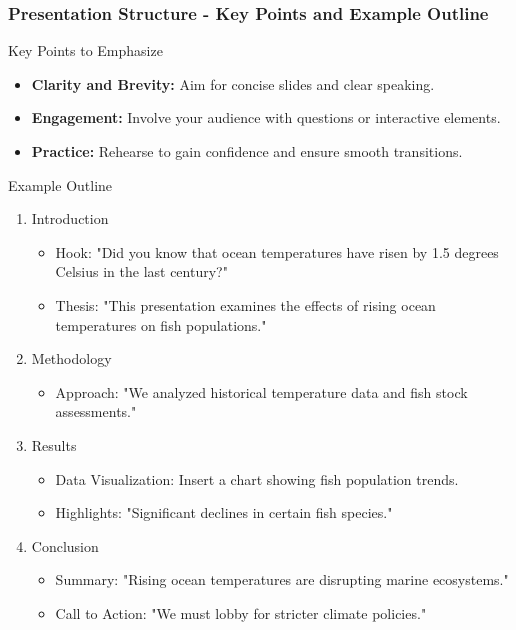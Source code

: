\documentclass[aspectratio=169]{beamer}
\begin{document}
\begin{frame}[fragile]
    \frametitle{Presentation Structure - Key Points and Example Outline}
    \begin{block}{Key Points to Emphasize}
        \begin{itemize}
            \item \textbf{Clarity and Brevity:} Aim for concise slides and clear speaking.
            \item \textbf{Engagement:} Involve your audience with questions or interactive elements.
            \item \textbf{Practice:} Rehearse to gain confidence and ensure smooth transitions.
        \end{itemize}
    \end{block}

    \begin{block}{Example Outline}
        \begin{enumerate}
            \item Introduction
                \begin{itemize}
                    \item Hook: "Did you know that ocean temperatures have risen by 1.5 degrees Celsius in the last century?"
                    \item Thesis: "This presentation examines the effects of rising ocean temperatures on fish populations."
                \end{itemize}
            \item Methodology
                \begin{itemize}
                    \item Approach: "We analyzed historical temperature data and fish stock assessments."
                \end{itemize}
            \item Results
                \begin{itemize}
                    \item Data Visualization: Insert a chart showing fish population trends.
                    \item Highlights: "Significant declines in certain fish species."
                \end{itemize}
            \item Conclusion
                \begin{itemize}
                    \item Summary: "Rising ocean temperatures are disrupting marine ecosystems."
                    \item Call to Action: "We must lobby for stricter climate policies."
                \end{itemize}
        \end{enumerate}
    \end{block}
\end{frame}
\end{document}
